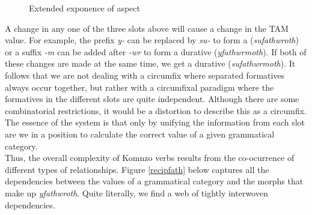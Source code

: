 \begin{figure}[H]
\begin{center}%
\end{center}
\caption{Extended exponence of aspect}
\label{extendfath}
\end{figure}%

A change in any one of the three slots above will cause a change in the TAM value. For example, the prefix \emph{y-} can be replaced by \emph{su-} to form a   (\emph{sufathwroth}) or a suffix \emph{-m} can be added after \emph{-wr} to form a  durative (\emph{yfathwrmoth}). If both of these changes are made at the same time, we get a  durative (\emph{sufathwrmoth}). It follows that we are not dealing with a circumfix where separated formatives always occur together, but rather with a circumfixal paradigm where the formatives in the different slots are quite independent. Although there are some combinatorial restrictions, it would be a distortion to describe this as a circumfix. The essence of the system is that only by unifying the information from each slot are we in a position to calculate the correct value of a given grammatical category.\\

Thus, the overall complexity of Komnzo verbs results from the co-ocurrence of different types of  relationships. Figure \ref{recipfath} below captures all the dependencies between the values of a grammatical category and the morphs that make up \emph{yfathwroth}. Quite literally, we find a web of tightly interwoven dependencies.

